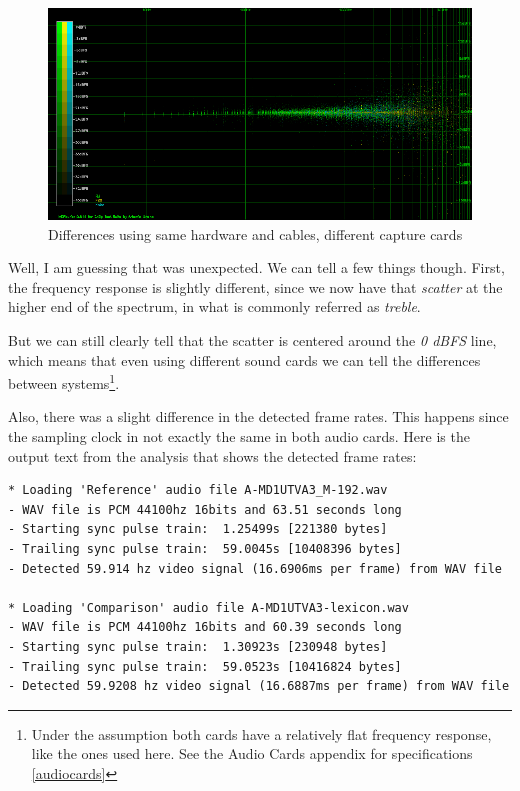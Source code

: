 \documentclass[10pt,a4paper]{report}
\begin{document}
\begin{figure}[H]
	\centering
	\includegraphics[width=1.0\linewidth]{images/interpretation/Plot5-1-All.png}
	\caption[Reversed FM Missing]{Differences using same hardware and cables, different capture cards}
	\label{fig:plot5-1-all}
\end{figure}

Well, I am guessing that was unexpected. We can tell a few things though. First, the frequency response is slightly different, since we now have that \textit{scatter} at the higher end of the spectrum, in what is commonly referred as \textit{treble}.

But we can still clearly tell that the scatter is centered around the \textit{0 dBFS} line, which means that even using different sound cards we can tell the differences between systems\footnote{Under the assumption both cards have a relatively flat frequency response, like the ones used here. See the Audio Cards appendix for specifications \ref{audiocards}}. 

Also, there was a slight difference in the detected frame rates. This happens since the sampling clock in not exactly the same in both audio cards. Here is the output text from the analysis that shows the detected frame rates:

\begin{verbatim}
* Loading 'Reference' audio file A-MD1UTVA3_M-192.wav
- WAV file is PCM 44100hz 16bits and 63.51 seconds long
- Starting sync pulse train:  1.25499s [221380 bytes]
- Trailing sync pulse train:  59.0045s [10408396 bytes]
- Detected 59.914 hz video signal (16.6906ms per frame) from WAV file

* Loading 'Comparison' audio file A-MD1UTVA3-lexicon.wav
- WAV file is PCM 44100hz 16bits and 60.39 seconds long
- Starting sync pulse train:  1.30923s [230948 bytes]
- Trailing sync pulse train:  59.0523s [10416824 bytes]
- Detected 59.9208 hz video signal (16.6887ms per frame) from WAV file
\end{verbatim}
\end{document}

